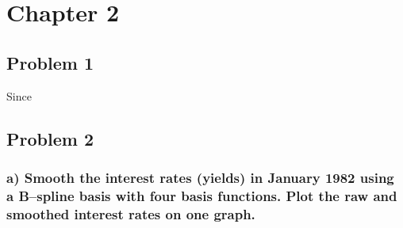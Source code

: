\documentclass[
]{article}
\newenvironment{Shaded}{\begin{snugshade}}{\end{snugshade}}
\newcommand{\AttributeTok}[1]{\textcolor[rgb]{0.77,0.63,0.00}{#1}}
\newcommand{\ConstantTok}[1]{\textcolor[rgb]{0.00,0.00,0.00}{#1}}
\newcommand{\DecValTok}[1]{\textcolor[rgb]{0.00,0.00,0.81}{#1}}
\newcommand{\FunctionTok}[1]{\textcolor[rgb]{0.00,0.00,0.00}{#1}}
\newcommand{\NormalTok}[1]{#1}
\newcommand{\OtherTok}[1]{\textcolor[rgb]{0.56,0.35,0.01}{#1}}
\newcommand{\SpecialCharTok}[1]{\textcolor[rgb]{0.00,0.00,0.00}{#1}}
\newcommand{\StringTok}[1]{\textcolor[rgb]{0.31,0.60,0.02}{#1}}
\begin{document}
\hypertarget{chapter-2}{%
\section{Chapter 2}\label{chapter-2}}

\hypertarget{problem-1-1}{%
\subsection{Problem 1}\label{problem-1-1}}

Since

\hypertarget{problem-2-1}{%
\subsection{Problem 2}\label{problem-2-1}}

\hypertarget{a-smooth-the-interest-rates-yields-in-january-1982-using-a-bspline-basis-with-four-basis-functions.-plot-the-raw-and-smoothed-interest-rates-on-one-graph.}{%
\subsubsection{a) Smooth the interest rates (yields) in January 1982
using a B--spline basis with four basis functions. Plot the raw and
smoothed interest rates on one
graph.}\label{a-smooth-the-interest-rates-yields-in-january-1982-using-a-bspline-basis-with-four-basis-functions.-plot-the-raw-and-smoothed-interest-rates-on-one-graph.}}

\begin{Shaded}
\end{Shaded}
\end{document}
